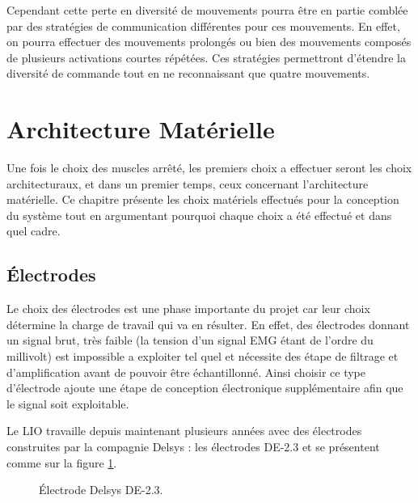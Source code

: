 \documentclass[letterpaper, twoside, 12pt, memoire, creativecommons, hyperref]{thETS}
\begin{document}
Cependant cette perte en diversité de mouvements pourra être en partie comblée par des stratégies de communication différentes pour ces mouvements. En effet, on pourra effectuer des mouvements prolongés ou bien des mouvements composés de plusieurs activations courtes répétées. Ces stratégies permettront d'étendre la diversité de commande tout en ne reconnaissant que quatre mouvements. 


\section{Architecture Matérielle}\label{CHarchimat}

Une fois le choix des muscles arrêté, les premiers choix a effectuer seront les choix architecturaux, et dans un premier temps, ceux concernant l'architecture matérielle. Ce chapitre présente les choix matériels effectués pour la conception du système tout en argumentant pourquoi chaque choix a été effectué et dans quel cadre.

\subsection{Électrodes}

Le choix des électrodes est une phase importante du projet car leur choix détermine la charge de travail qui va en résulter. En effet, des électrodes donnant un signal brut, très faible (la tension d'un signal EMG étant de l'ordre du millivolt) est impossible a exploiter tel quel et nécessite des étape de filtrage et d'amplification avant de pouvoir être échantillonné. Ainsi choisir ce type d'électrode ajoute une étape de conception électronique supplémentaire afin que le signal soit exploitable.

Le LIO travaille depuis maintenant plusieurs années avec des électrodes construites par la compagnie Delsys : les électrodes DE-2.3 et se présentent comme sur la figure \ref{fig:de2.3}. 

\begin{figure}
	\centering
	\caption{Électrode Delsys DE-2.3.}
	\label{fig:de2.3}
\end{figure}
\end{document}
